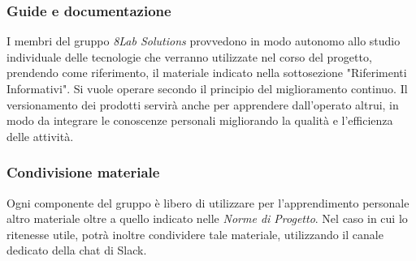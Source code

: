 	\subsubsection{Guide e documentazione}
	I membri del gruppo \textit{8Lab Solutions} provvedono in modo autonomo allo studio individuale delle tecnologie che verranno utilizzate nel corso del  progetto, prendendo  come  riferimento, il  materiale  indicato  nella  sottosezione "Riferimenti Informativi".
	Si vuole operare secondo il principio del miglioramento continuo.
	Il versionamento dei prodotti servirà anche per apprendere dall'operato altrui, in modo da integrare le conoscenze personali migliorando la qualità e l'efficienza delle attività.
	\subsubsection{Condivisione materiale}
	Ogni componente del gruppo è libero di utilizzare per l'apprendimento personale altro materiale oltre a quello indicato nelle \textit{Norme di Progetto}. Nel caso in cui lo ritenesse utile, potrà inoltre condividere tale materiale, utilizzando il canale dedicato della chat di Slack\glo.